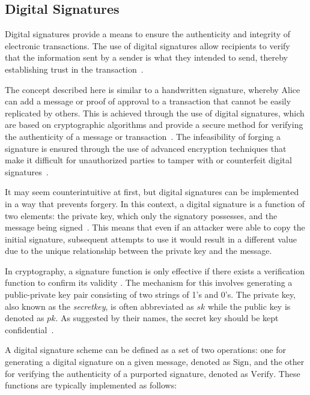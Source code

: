 \subsection{Digital Signatures}
Digital signatures provide a means to ensure the authenticity and integrity of electronic transactions. The use of
digital signatures allow recipients to verify that the information sent by a sender is what they intended to send,
thereby establishing trust in the transaction~\cite{stinson2018cryptography}.

The concept described here is similar to a handwritten signature, whereby Alice can add a message or proof of approval
to a transaction that cannot be easily replicated by others. This is achieved through the use of digital signatures,
which are based on cryptographic algorithms and provide a secure method for verifying the authenticity of a message or
transaction~\cite{elgamal1985public}. The infeasibility of forging a signature is ensured through the use of advanced
encryption techniques that make it difficult for unauthorized parties to tamper with or counterfeit digital
signatures~\cite{elgamal1985public}.

%

It may seem counterintuitive at first, but digital signatures can be implemented in a way that prevents forgery. In this
context, a digital signature is a function of two elements: the private key, which only the signatory possesses, and the
message being signed~\cite{diffie2022new}. This means that even if an attacker were able to copy the initial signature,
subsequent attempts to use it would result in a different value due to the unique relationship between the private key
and the message.

In cryptography, a signature function is only effective if there exists a verification function to confirm its validity
\cite{stallings2006cryptography}. The mechanism for this involves generating a public-private key pair consisting of two
strings of 1's and 0's. The private key, also known as the \textit{secretkey}, is often abbreviated as $sk$ while the
public key is denoted as $pk$. As suggested by their names, the secret key should be kept confidential~\cite{dss}.

A digital signature scheme can be defined as a set of two operations: one for generating a digital signature on a given
message, denoted as $\text{Sign}$, and the other for verifying the authenticity of a purported signature, denoted as
$\text{Verify}$. These functions are typically implemented as follows:

